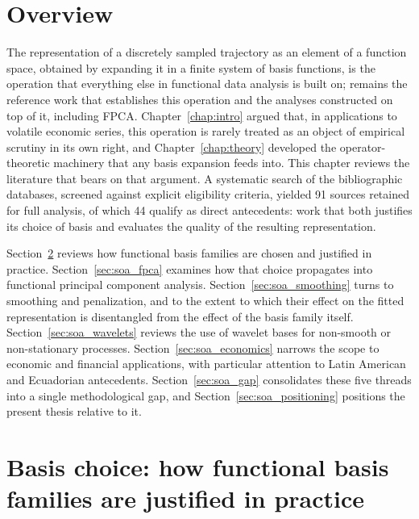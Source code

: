 \section{Overview}
\label{sec:soa_overview}

The representation of a discretely sampled trajectory as an element of a
function space, obtained by expanding it in a finite system of basis
functions, is the operation that everything else in functional data
analysis is built on; \cite{ramsay2005} remains the reference work that
establishes this operation and the analyses constructed on top of it,
including FPCA. Chapter~\ref{chap:intro} argued that, in applications to
volatile economic series, this operation is rarely treated as an object
of empirical scrutiny in its own right, and Chapter~\ref{chap:theory}
developed the operator-theoretic machinery that any basis expansion feeds
into. This chapter reviews the literature that bears on that argument. A
systematic search of the bibliographic databases, screened against
explicit eligibility criteria, yielded 91 sources retained for full
analysis, of which 44 qualify as direct antecedents: work that both
justifies its choice of basis and evaluates the quality of the resulting
representation.

Section~\ref{sec:soa_basis_choice} reviews how functional basis families
are chosen and justified in practice. Section~\ref{sec:soa_fpca} examines
how that choice propagates into functional principal component analysis.
Section~\ref{sec:soa_smoothing} turns to smoothing and penalization, and
to the extent to which their effect on the fitted representation is
disentangled from the effect of the basis family itself.
Section~\ref{sec:soa_wavelets} reviews the use of wavelet bases for
non-smooth or non-stationary processes. Section~\ref{sec:soa_economics}
narrows the scope to economic and financial applications, with
particular attention to Latin American and Ecuadorian antecedents.
Section~\ref{sec:soa_gap} consolidates these five threads into a single
methodological gap, and Section~\ref{sec:soa_positioning} positions the
present thesis relative to it.

\section{Basis choice: how functional basis families are justified in
practice}
\label{sec:soa_basis_choice}

